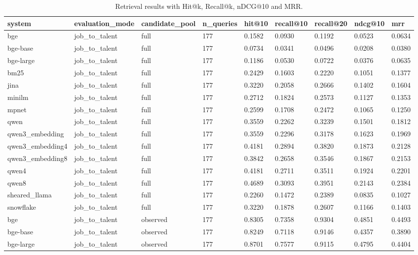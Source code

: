 \begin{table}[t]
\centering
\caption{Retrieval results with Hit@k, Recall@k, nDCG@10 and MRR.}
\label{tab:summary}
\begin{tabular}{lllllllll}
\toprule
system & evaluation_mode & candidate_pool & n_queries & hit@10 & recall@10 & recall@20 & ndcg@10 & mrr \\
\midrule
bge & job_to_talent & full & 177 & 0.1582 & 0.0930 & 0.1192 & 0.0523 & 0.0634 \\
bge-base & job_to_talent & full & 177 & 0.0734 & 0.0341 & 0.0496 & 0.0208 & 0.0380 \\
bge-large & job_to_talent & full & 177 & 0.1186 & 0.0530 & 0.0722 & 0.0376 & 0.0635 \\
bm25 & job_to_talent & full & 177 & 0.2429 & 0.1603 & 0.2220 & 0.1051 & 0.1377 \\
jina & job_to_talent & full & 177 & 0.3220 & 0.2058 & 0.2666 & 0.1402 & 0.1604 \\
minilm & job_to_talent & full & 177 & 0.2712 & 0.1824 & 0.2573 & 0.1127 & 0.1353 \\
mpnet & job_to_talent & full & 177 & 0.2599 & 0.1708 & 0.2472 & 0.1065 & 0.1250 \\
qwen & job_to_talent & full & 177 & 0.3559 & 0.2262 & 0.3239 & 0.1501 & 0.1812 \\
qwen3_embedding & job_to_talent & full & 177 & 0.3559 & 0.2296 & 0.3178 & 0.1623 & 0.1969 \\
qwen3_embedding4 & job_to_talent & full & 177 & 0.4181 & 0.2894 & 0.3820 & 0.1873 & 0.2128 \\
qwen3_embedding8 & job_to_talent & full & 177 & 0.3842 & 0.2658 & 0.3546 & 0.1867 & 0.2153 \\
qwen4 & job_to_talent & full & 177 & 0.4181 & 0.2711 & 0.3511 & 0.1924 & 0.2201 \\
qwen8 & job_to_talent & full & 177 & 0.4689 & 0.3093 & 0.3951 & 0.2143 & 0.2384 \\
sheared_llama & job_to_talent & full & 177 & 0.2260 & 0.1472 & 0.2389 & 0.0835 & 0.1027 \\
snowflake & job_to_talent & full & 177 & 0.3220 & 0.1878 & 0.2607 & 0.1166 & 0.1403 \\
bge & job_to_talent & observed & 177 & 0.8305 & 0.7358 & 0.9304 & 0.4851 & 0.4493 \\
bge-base & job_to_talent & observed & 177 & 0.8249 & 0.7118 & 0.9146 & 0.4357 & 0.3890 \\
bge-large & job_to_talent & observed & 177 & 0.8701 & 0.7577 & 0.9115 & 0.4795 & 0.4404 \\

\end{tabular}
\end{table}
